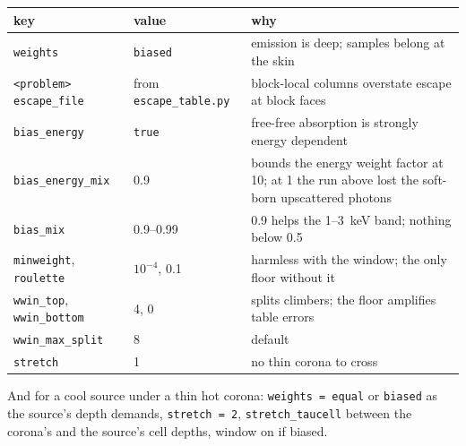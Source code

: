 \documentclass[11pt]{article}
\newcommand{\key}[1]{\texttt{#1}}
\begin{document}
\begin{center}
\begin{tabular}{@{}llp{2.6in}@{}}
\toprule
key & value & why \\
\midrule
\key{weights} & \key{biased} & emission is deep; samples belong at the skin \\
\key{<problem> escape\_file} & from \key{escape\_table.py} & block-local columns overstate escape at block faces \\
\key{bias\_energy} & \key{true} & free-free absorption is strongly energy dependent \\
\key{bias\_energy\_mix} & 0.9 & bounds the energy weight factor at 10; at 1 the run above lost the soft-born upscattered photons \\
\key{bias\_mix} & 0.9--0.99 & 0.9 helps the 1--3~keV band; nothing below 0.5 \\
\key{minweight}, \key{roulette} & $10^{-4}$, 0.1 & harmless with the window; the only floor without it \\
\key{wwin\_top}, \key{wwin\_bottom} & 4, 0 & splits climbers; the floor amplifies table errors \\
\key{wwin\_max\_split} & 8 & default \\
\key{stretch} & 1 & no thin corona to cross \\
\bottomrule
\end{tabular}
\end{center}

And for a cool source under a thin hot corona: \key{weights = equal} or \key{biased} as
the source's depth demands, \key{stretch = 2}, \key{stretch\_taucell} between the
corona's and the source's cell depths, window on if biased.
\end{document}
